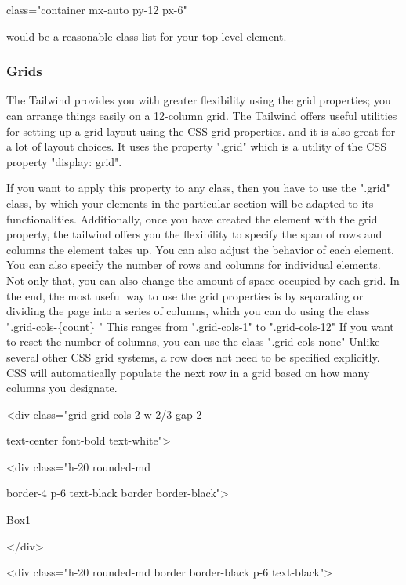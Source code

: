 \documentclass[conference]{IEEEtran}
\begin{document}
class="container mx-auto py-12 px-6"

would be a reasonable class list for your top-level element.

\subsubsection{\textbf{Grids}}

The Tailwind provides you with greater flexibility using the grid
properties; you can arrange things easily on a 12-column grid. The Tailwind offers useful utilities for setting up a grid layout using the CSS grid properties. and it is also great for a lot of layout choices. It uses the property ".grid" which is a utility of the CSS property "display: grid".

If you want to apply this property to any class, then you have to use the ".grid" class, by which your elements in the particular section will be adapted to its functionalities. Additionally, once you have created the element with the grid property, the tailwind offers you the flexibility to specify the span of rows and columns the element takes up. You can also adjust the behavior of each element. You can also specify the number of rows and columns for individual elements. Not only that, you can also change the amount of space occupied by each grid. In the end, the most useful way to use the grid properties is by separating
or dividing the page into a series of columns, which you can do using the class ".grid-cols-\{count\} " This ranges from ".grid-cols-1" to
".grid-cols-12" If you want to reset the number of columns, you can use the class ".grid-cols-none"
Unlike several other CSS grid systems, a row does not need to be
specified explicitly. CSS will automatically populate the next row in a grid based on how many columns you designate.
\newline

\textless div class="grid grid-cols-2 w-2/3 gap-2

text-center font-bold text-white"\textgreater{}

            \textless div class="h-20 rounded-md

                border-4 p-6 text-black border border-black"\textgreater{}

                    Box1

                \textless/div\textgreater{}

\textless div class="h-20 rounded-md
border border-black p-6 text-black"\textgreater{}
\end{document}
